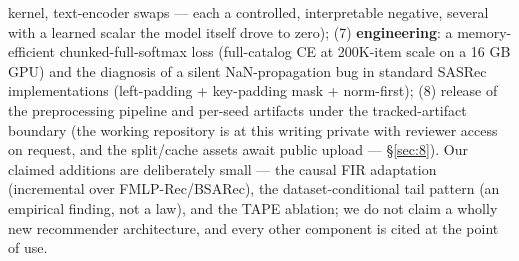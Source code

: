 kernel, text-encoder swaps --- each a controlled, interpretable negative, several with a learned scalar the model itself drove to zero); (7) \textbf{engineering}: a memory-efficient chunked-full-softmax loss (full-catalog CE at 200K-item scale on a 16 GB GPU) and the diagnosis of a silent NaN-propagation bug in standard SASRec implementations (left-padding + key-padding mask + norm-first); (8) release of the preprocessing pipeline and per-seed artifacts under the tracked-artifact boundary (the working repository is at this writing private with reviewer access on request, and the split/cache assets await public upload --- \S\ref{sec:8}). Our claimed additions are deliberately small --- the causal FIR adaptation (incremental over FMLP-Rec/BSARec), the dataset-conditional tail pattern (an empirical finding, not a law), and the TAPE ablation; we do not claim a wholly new recommender architecture, and every other component is cited at the point of use.

